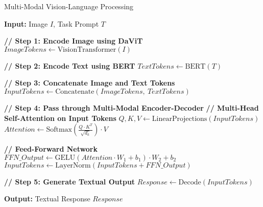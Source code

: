\begin{algorithm}
\caption{Multi-Modal Vision-Language Processing}
\label{alg:multimodal_vlp}
\noindent\textbf{Input:} Image $I$, Task Prompt $T$
\begin{algorithmic}[1]

\State \textbf{// Step 1: Encode Image using DaViT}
\State $ImageTokens \gets \text{VisionTransformer}(I)$

\State \textbf{// Step 2: Encode Text using BERT}
\State $TextTokens \gets \text{BERT}(T)$

\State \textbf{// Step 3: Concatenate Image and Text Tokens}
\State $InputTokens \gets \text{Concatenate}(ImageTokens,\ TextTokens)$

\State \textbf{// Step 4: Pass through Multi-Modal Encoder-Decoder}
    \State \textbf{// Multi-Head Self-Attention on Input Tokens}
    \State $Q, K, V \gets \text{LinearProjections}(InputTokens)$
    \State $Attention \gets \text{Softmax}\left( \frac{Q \cdot K^T}{\sqrt{d_k}} \right) \cdot V$
    
    \State \textbf{// Feed-Forward Network}
    \State $FFN\_Output \gets \text{GELU}(Attention \cdot W_1 + b_1) \cdot W_2 + b_2$
    \State $InputTokens \gets \text{LayerNorm}(InputTokens + FFN\_Output)$
\EndFor

\State \textbf{// Step 5: Generate Textual Output}
\State $Response \gets \text{Decode}(InputTokens)$

\end{algorithmic}
\noindent\textbf{Output:} Textual Response $Response$
\end{algorithm}
